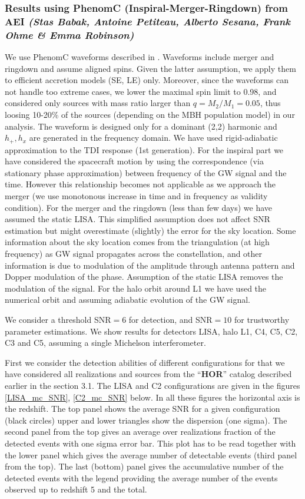 \documentclass{iopart}
\begin{document}
\subsubsection{Results using PhenomC (Inspiral-Merger-Ringdown) from AEI {\it (Stas Babak, Antoine Petiteau, Alberto Sesana, Frank Ohme \& Emma Robinson)}}
\label{SSS:MBHbPEPhenomAEI}
We use PhenomC waveforms described in \cite{Santamaria:2010yb}. Waveforms include merger and ringdown and assume aligned spins. Given the latter assumption, we apply them to efficient accretion models (SE, LE) only. Moreover, since the waveforms can not handle too extreme cases, we lower the maximal spin limit to 0.98, and considered only sources with mass ratio larger than $q=M_2/M_1=0.05$, thus loosing 10-20\% of the sources (depending on the MBH population model) in our analysis. The waveform is designed only for a dominant (2,2) harmonic and $h_{+}, h_{x}$ are
generated in the frequency domain. We have used rigid-adiabatic approximation to the TDI response (1st generation). For the inspiral part 
we have considered the spacecraft motion by using the correspondence (via  stationary phase  approximation) between frequency of the GW signal 
and the time. However this relationship becomes not applicable as we approach the merger (we use monotonous increase in time and in frequency
as validity condition).  For the merger and the ringdown (less than few days) we have assumed the static LISA. This simplified assumption 
does not affect SNR estimation but might overestimate (slightly) the error for the sky location. Some information about the sky location 
comes from the triangulation (at high frequency) as GW signal propagates across the constellation, and other information is due to modulation of the 
amplitude through antenna pattern and Dopper modulation of the phase. Assumption of the static LISA removes the modulation of the signal.
For the halo orbit around L1 we have used the numerical orbit and assuming adiabatic evolution of the GW signal.

We consider a threshold SNR$=6$ for detection, and SNR$=10$ for trustworthy parameter estimations. We show results for detectors LISA, halo L1, C4, C5, C2, C3 and C5,  assuming a single Michelson interferometer. 

First we consider the detection abilities of different configurations for that we have considered all realizations and sources from 
the ``{\bf HOR}'' catalog  described earlier in the section 3.1. The LISA and C2 configurations are given in the figures \ref{LISA_mc_SNR},
 \ref{C2_mc_SNR} below.  In all these figures the horizontal axis is the redshift. The top panel shows the average SNR for a given 
 configuration (black circles) upper and lower triangles show the dispersion (one sigma). The second panel from the top gives an 
 average over realizations fraction of the  detected events with one sigma error bar. This plot has to be read together with the lower panel
 which gives the average number of detectable events (third panel from the top). The last (bottom) panel gives the accumulative number of the 
 detected events with the legend providing the average number of the events observed up to redshift 5 and the total.
\end{document}
